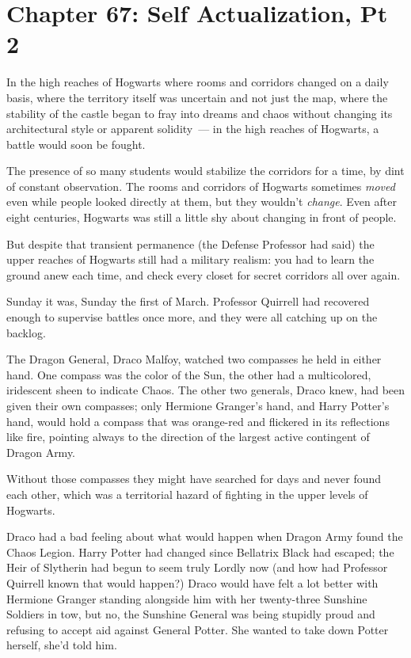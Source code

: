 \chapter{Chapter 67: Self Actualization, Pt 2}
In the high reaches of Hogwarts where rooms and corridors changed on a daily basis, where the territory itself was uncertain and not just the map, where the stability of the castle began to fray into dreams and chaos without changing its architectural style or apparent solidity~--- in the high reaches of Hogwarts, a battle would soon be fought.

The presence of so many students would stabilize the corridors for a time, by dint of constant observation. The rooms and corridors of Hogwarts sometimes \emph{moved} even while people looked directly at them, but they wouldn't \emph{change}. Even after eight centuries, Hogwarts was still a little shy about changing in front of people.

But despite that transient permanence (the Defense Professor had said) the upper reaches of Hogwarts still had a military realism: you had to learn the ground anew each time, and check every closet for secret corridors all over again.

Sunday it was, Sunday the first of March. Professor Quirrell had recovered enough to supervise battles once more, and they were all catching up on the backlog.

The Dragon General, Draco Malfoy, watched two compasses he held in either hand. One compass was the color of the Sun, the other had a multicolored, iridescent sheen to indicate Chaos. The other two generals, Draco knew, had been given their own compasses; only Hermione Granger's hand, and Harry Potter's hand, would hold a compass that was orange-red and flickered in its reflections like fire, pointing always to the direction of the largest active contingent of Dragon Army.

Without those compasses they might have searched for days and never found each other, which was a territorial hazard of fighting in the upper levels of Hogwarts.

Draco had a bad feeling about what would happen when Dragon Army found the Chaos Legion. Harry Potter had changed since Bellatrix Black had escaped; the Heir of Slytherin had begun to seem truly Lordly now (and how had Professor Quirrell known that would happen?) Draco would have felt a lot better with Hermione Granger standing alongside him with her twenty-three Sunshine Soldiers in tow, but no, the Sunshine General was being stupidly proud and refusing to accept aid against General Potter. She wanted to take down Potter herself, she'd told him.

